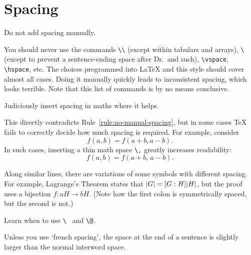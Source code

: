 \section{Spacing}

\begin{Rule}
  \label{rule:no-manual-spacing}
  Do not add spacing manually.
\end{Rule}

You should never use the commands \lstinline-\\- (except within
tabulars and arrays), \lstinline[showspaces=true]-\ - (except to
prevent a sentence-ending space after Dr.\ and such),
\lstinline-\vspace-, \lstinline-\hspace-, etc.  The choices programmed
into \LaTeX{} and this style should cover almost all cases.  Doing it
manually quickly leads to inconsistent spacing, which looks terrible.
Note that this list of commands is by no means conclusive.

\begin{Rule}
  Judiciously insert spacing in maths where it helps.
\end{Rule}

This directly contradicts Rule~\ref{rule:no-manual-spacing}, but in
some cases \TeX{} fails to correctly decide how much spacing is
required.  For example, consider
\begin{displaymath}
  f(a,b) = f(a+b, a-b).
\end{displaymath}
In such cases, inserting a thin math space \lstinline-\,- greatly
increases readability:
\begin{displaymath}
  f(a,b) = f(a+b,\, a-b).
\end{displaymath}

Along similar lines, there are variations of some symbols with
different spacing.  For example, Lagrange's Theorem states that
\(\lvert G\rvert=[G:H]\lvert H\rvert\), but the proof uses a bijection \(f\colon
aH\to bH\).  (Note how the first colon is symmetrically spaced, but
the second is not.)

\begin{Rule}
  Learn when to use \lstinline[showspaces=true]-\ - and
  \lstinline-\@-.
\end{Rule}

Unless you use `french spacing', the space at the end of a sentence is
slightly larger than the normal interword space.

